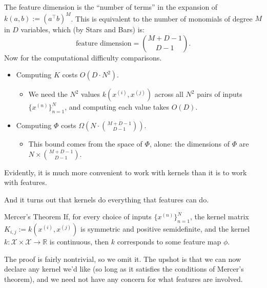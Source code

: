 \begin{solution}
    The feature dimension is the ``number of terms'' in
    the expansion of $k(a, b) := (a^{\top}b)^{M}$.
    This is equivalent to the number of monomials of degree $M$
    in $D$ variables, which (by Stars and Bars) is:
    \[ \text{feature dimension} = \binom{M + D - 1}{D - 1}. \]
    Now for the computational difficulty comparisons.
    \begin{itemize}
        \item Computing $K$ costs $O(D \cdot N^2)$.
        \begin{itemize}
            \item We need the $N^2$ values $k(x^{(i)}, x^{(j)})$
        across all $N^2$ pairs of inputs $\{x^{(n)}\}_{n = 1}^N$,
        and computing each value takes $O(D)$.
        \end{itemize}
        \item Computing $\Phi$ costs $\Omega\left(
            N \cdot \binom{M + D - 1}{D - 1}
        \right)$.
        \begin{itemize}
            \item This bound comes from the space of $\Phi$, alone:
            the dimensions of $\Phi$ are
            $N \times \binom{M + D - 1}{D - 1}$.
        \end{itemize}
    \end{itemize}
    Evidently, it is much more convenient to work with kernels
    than it is to work with features.
\end{solution}

And it turns out that kernels do everything that features can do.

\begin{theorem}{Mercer's Theorem}
    If, for every choice of inputs $\{x^{(n)}\}_{n = 1}^N$,
    the kernel matrix $K_{i, j} := k(x^{(i)}, x^{(j)})$
    is symmetric and positive semidefinite, and
    the kernel $k\colon \mathcal{X} \times \mathcal{X} \to \mathbb{R}$
    is continuous,
    then $k$ corresponds to some feature map $\phi$.
\end{theorem}

The proof is fairly nontrivial, so we omit it.
The upshot is that we can now declare any kernel we'd like
(so long as it satisfies the conditions of Mercer's theorem),
and we need not have any concern for what features are involved.

